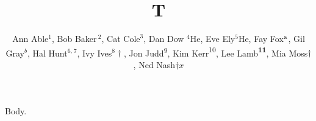 \documentclass{article}
\begin{document}
\title{T}
\author{Ann Able$^{1}$, Bob Baker$\,^{2}$, Cat $\mathrm{Cole}^{3}$, Dan Dow ${}^{4}$He, Eve Ely${}^{5}\mathrm{He}$,
Fay Fox$\rm ^{a}$, Gil Gray{\rm $^{b}$}, Hal Hunt$^{6,}$$^{7}$, Ivy Ives$^{8}\dagger$, Jon Judd\textsuperscript{9},
Kim Kerr{\textsuperscript{10}}, Lee Lamb\textbf{\textsuperscript{11}}, Mia Moss$\dagger$, Ned Nash$\dagger x$}
\maketitle
Body.
\end{document}
